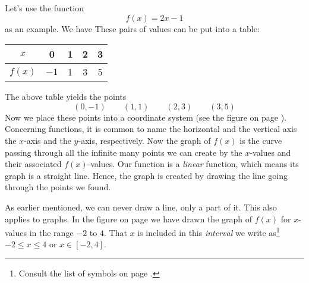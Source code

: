 Let's use the function
\[ f(x)=2x-1 \]
as an example. We have
These pairs of values can be put into a table:
	\begin{center}
	\begin{tabular}{c | c |c |c|c}
		$ x $ & 0 & 1 & 2 & 3 \\ \hline
		$ f(x) $ &$  -1 $ & 1&3 &5
	\end{tabular}
\end{center}
The above table yields the points
\[ (0, -1)\quad\quad(1, 1)\quad\quad(2, 3)\quad\quad(3, 5) \]
Now we place these points into a coordinate system (see the figure on page \pageref{funkfig}). Concerning functions, it is common to name the horizontal and the vertical axis the $ x $-axis and the $ y $-axis, respectively. 
Now the graph of $ f(x) $ is the curve passing through all the infinite many points we can create by the $ x$-values and their associated $ f(x) $-values. Our function is a \textit{linear} function, which means its graph is a straight line. Hence, the graph is created by drawing the line going through the points we found.\vsk

As earlier mentioned, we can never draw a line, only a part of it. This also applies to graphs. In the figure on page \pageref{funkfig} we have drawn the graph of $ f(x) $ for $ x $-values in the range $ -2 $ to $ 4 $. That $ x $ is included in this \textit{interval} we write as\footnote{Consult the list of symbols on page \pageref{Symbol}.} $ -2\leq x\leq 4 $ or $ x\in[-2, 4] $.
\newpage

 \label{funkfig} \vspace{-18pt}


